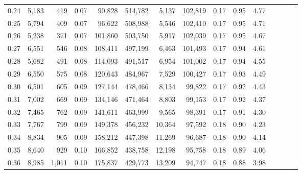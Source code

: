 \begin{tabular}{rrrcrrrrrrrrrrr}
0.24 &   5,183 &    419 &                                       0.07 &   90,828 &  514,782 &    5,137 &  102,819 &  0.17 &  0.95 &                         4.77 \\
0.25 &   5,794 &    409 &                                       0.07 &   96,622 &  508,988 &    5,546 &  102,410 &  0.17 &  0.95 &                         4.71 \\
0.26 &   5,238 &    371 &                                       0.07 &  101,860 &  503,750 &    5,917 &  102,039 &  0.17 &  0.95 &                         4.67 \\
0.27 &   6,551 &    546 &                                       0.08 &  108,411 &  497,199 &    6,463 &  101,493 &  0.17 &  0.94 &                         4.61 \\
0.28 &   5,682 &    491 &                                       0.08 &  114,093 &  491,517 &    6,954 &  101,002 &  0.17 &  0.94 &                         4.55 \\
0.29 &   6,550 &    575 &                                       0.08 &  120,643 &  484,967 &    7,529 &  100,427 &  0.17 &  0.93 &                         4.49 \\
0.30 &   6,501 &    605 &                                       0.09 &  127,144 &  478,466 &    8,134 &   99,822 &  0.17 &  0.92 &                         4.43 \\
0.31 &   7,002 &    669 &                                       0.09 &  134,146 &  471,464 &    8,803 &   99,153 &  0.17 &  0.92 &                         4.37 \\
0.32 &   7,465 &    762 &                                       0.09 &  141,611 &  463,999 &    9,565 &   98,391 &  0.17 &  0.91 &                         4.30 \\
0.33 &   7,767 &    799 &                                       0.09 &  149,378 &  456,232 &   10,364 &   97,592 &  0.18 &  0.90 &                         4.23 \\
0.34 &   8,834 &    905 &                                       0.09 &  158,212 &  447,398 &   11,269 &   96,687 &  0.18 &  0.90 &                         4.14 \\
0.35 &   8,640 &    929 &                                       0.10 &  166,852 &  438,758 &   12,198 &   95,758 &  0.18 &  0.89 &                         4.06 \\
0.36 &   8,985 &  1,011 &                                       0.10 &  175,837 &  429,773 &   13,209 &   94,747 &  0.18 &  0.88 &                         3.98 \\

\end{tabular}
